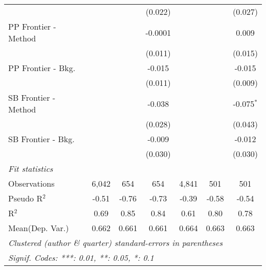 \begin{tabular}{lcccccc}
                               &         &              & (0.022) &         &               & (0.027)\\   
   PP Frontier - Method        &         &              & -0.0001 &         &               & 0.009\\   
                               &         &              & (0.011) &         &               & (0.015)\\   
   PP Frontier - Bkg.          &         &              & -0.015  &         &               & -0.015\\   
                               &         &              & (0.011) &         &               & (0.009)\\   
   SB Frontier - Method        &         &              & -0.038  &         &               & -0.075$^{*}$\\   
                               &         &              & (0.028) &         &               & (0.043)\\   
   SB Frontier - Bkg.          &         &              & -0.009  &         &               & -0.012\\   
                               &         &              & (0.030) &         &               & (0.030)\\   
   \midrule
   \emph{Fit statistics}\\
   Observations                & 6,042   & 654          & 654     & 4,841   & 501           & 501\\  
   Pseudo R$^2$                & -0.51   & -0.76        & -0.73   & -0.39   & -0.58         & -0.54\\  
   R$^2$                       & 0.69    & 0.85         & 0.84    & 0.61    & 0.80          & 0.78\\  
Mean(Dep. Var.) & 0.662 & 0.661 & 0.661 & 0.664 & 0.663 & 0.663 \\
   \midrule \midrule
   \multicolumn{7}{l}{\emph{Clustered (author \& quarter) standard-errors in parentheses}}\\
   \multicolumn{7}{l}{\emph{Signif. Codes: ***: 0.01, **: 0.05, *: 0.1}}\\
\end{tabular}
\par\endgroup
